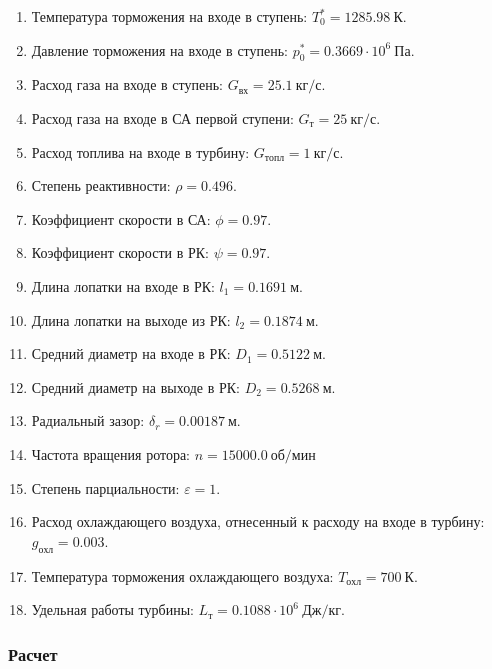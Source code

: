 \documentclass[a4paper,10pt]{article}
\begin{document}
    
    \begin{enumerate}

        \item Температура торможения на входе в ступень: $T_0^* = 1285.98\ К $.
        \item Давление торможения на входе в ступень: $p_0^* = 0.3669 \cdot 10^6 \ Па$.
        \item Расход газа на входе в ступень: $G_{вх} = 25.1\ кг/с$.
        \item Расход газа на входе в СА первой ступени: $ G_т = 25\ кг/с $.
        \item Расход топлива на входе в турбину: $ G_{топл} = 1\ кг/с $.
        \item Степень реактивности: $ \rho = 0.496 $.
        \item Коэффициент скорости в СА: $ \phi = 0.97 $.
        \item Коэффициент скорости в РК: $ \psi = 0.97 $.
        \item Длина лопатки на входе в РК: $ l_1 = 0.1691\ м $.
        \item Длина лопатки на выходе из РК: $ l_2 = 0.1874\ м $.
        \item Средний диаметр на входе в РК: $ D_1 = 0.5122\ м $.
        \item Средний диаметр на выходе в РК: $ D_2 = 0.5268\ м $.
        \item Радиальный зазор: $ \delta_r = 0.00187\ м $.
        \item Частота вращения ротора: $ n = 15000.0\ об/мин $
        \item Степень парциальности: $ \varepsilon = 1 $.
        \item Расход охлаждающего воздуха, отнесенный к расходу на входе в турбину: $ g_{охл} = 0.003 $.
        \item Температура торможения охлаждающего воздуха: $ T_{охл} = 700\ К $.

        
        \item Удельная работы турбины: $ L_т = 0.1088 \cdot 10^6 \ Дж/кг $.

        

    \end{enumerate}
    

    \subsubsection{Расчет}

    
\end{document}
